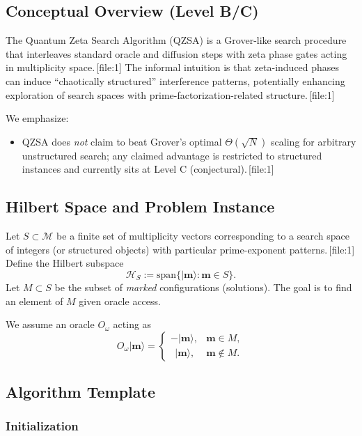 \documentclass[11pt]{article}
\begin{document}
\subsection{Conceptual Overview (Level B/C)}

The Quantum Zeta Search Algorithm (QZSA) is a Grover-like search procedure that interleaves standard oracle and diffusion steps with zeta phase gates acting in multiplicity space.\,[file:1] The informal intuition is that zeta-induced phases can induce ``chaotically structured'' interference patterns, potentially enhancing exploration of search spaces with prime-factorization-related structure.\,[file:1]

We emphasize:

\begin{itemize}[leftmargin=*]
    \item QZSA does \emph{not} claim to beat Grover's optimal \(\Theta(\sqrt{N})\) scaling for arbitrary unstructured search; any claimed advantage is restricted to structured instances and currently sits at Level C (conjectural).\,[file:1]
\end{itemize}

\subsection{Hilbert Space and Problem Instance}

Let \(S \subset \mathcal{M}\) be a finite set of multiplicity vectors corresponding to a search space of integers (or structured objects) with particular prime-exponent patterns.\,[file:1] Define the Hilbert subspace
\[
\mathcal{H}_S := \text{span}\{ \lvert \mathbf{m} \rangle : \mathbf{m} \in S \}.
\]
Let \(M \subset S\) be the subset of \emph{marked} configurations (solutions). The goal is to find an element of \(M\) given oracle access.

We assume an oracle \(O_\omega\) acting as
\[
O_\omega \lvert \mathbf{m} \rangle =
\begin{cases}
- \lvert \mathbf{m} \rangle, & \mathbf{m} \in M,\\
\ \ \lvert \mathbf{m} \rangle, & \mathbf{m} \notin M.
\end{cases}
\]

\subsection{Algorithm Template}

\subsubsection{Initialization}
\end{document}
